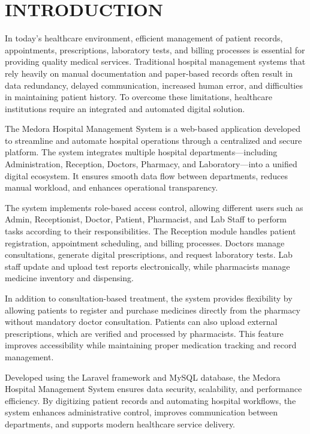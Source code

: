 \chapter{INTRODUCTION}

In today’s healthcare environment, efficient management of patient records, appointments, prescriptions, laboratory tests, and billing processes is essential for providing quality medical services. Traditional hospital management systems that rely heavily on manual documentation and paper-based records often result in data redundancy, delayed communication, increased human error, and difficulties in maintaining patient history. To overcome these limitations, healthcare institutions require an integrated and automated digital solution.

The Medora Hospital Management System is a web-based application developed to streamline and automate hospital operations through a centralized and secure platform. The system integrates multiple hospital departments—including Administration, Reception, Doctors, Pharmacy, and Laboratory—into a unified digital ecosystem. It ensures smooth data flow between departments, reduces manual workload, and enhances operational transparency.

The system implements role-based access control, allowing different users such as Admin, Receptionist, Doctor, Patient, Pharmacist, and Lab Staff to perform tasks according to their responsibilities. The Reception module handles patient registration, appointment scheduling, and billing processes. Doctors manage consultations, generate digital prescriptions, and request laboratory tests. Lab staff update and upload test reports electronically, while pharmacists manage medicine inventory and dispensing.

In addition to consultation-based treatment, the system provides flexibility by allowing patients to register and purchase medicines directly from the pharmacy without mandatory doctor consultation. Patients can also upload external prescriptions, which are verified and processed by pharmacists. This feature improves accessibility while maintaining proper medication tracking and record management.

Developed using the Laravel framework and MySQL database, the Medora Hospital Management System ensures data security, scalability, and performance efficiency. By digitizing patient records and automating hospital workflows, the system enhances administrative control, improves communication between departments, and supports modern healthcare service delivery.

